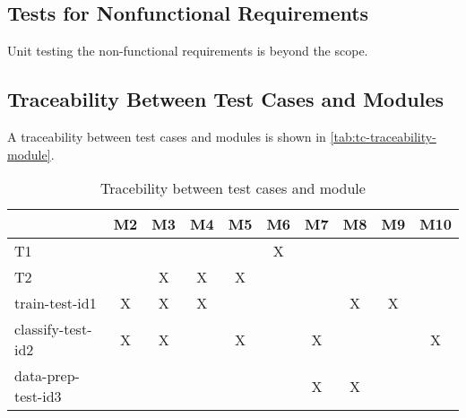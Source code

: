 \documentclass[12pt, titlepage]{article}
\begin{document}
\subsection{Tests for Nonfunctional Requirements}

Unit testing the non-functional requirements is beyond the scope.

\subsection{Traceability Between Test Cases and Modules}

A traceability between test cases and modules is shown in \autoref{tab:tc-traceability-module}.

\begin{table}[h!]
\begin{center}
\begin{tabular}{ l|c|c|c|c|c|c|c|c|c }
\hline
 & M2 & M3 & M4 & M5 & M6 & M7 & M8 & M9 & M10\\
\hline
T1 & & & & & X & & & &\\
\hline
T2 & & X & X & X & & & & &\\
\hline
train-test-id1 & X & X & X & & & & X & X &\\
\hline
classify-test-id2 & X & X & & X & & X & & & X\\
\hline
data-prep-test-id3 & & & & & & X & X & &\\

\hline
\end{tabular}
\caption{Tracebility between test cases and module}
\label{tab:tc-traceability-module}
\end{center}
\end{table}
				




\newpage




\end{document}
